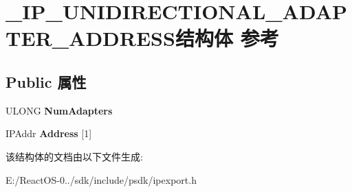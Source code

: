\hypertarget{struct___i_p___u_n_i_d_i_r_e_c_t_i_o_n_a_l___a_d_a_p_t_e_r___a_d_d_r_e_s_s}{}\section{\+\_\+\+I\+P\+\_\+\+U\+N\+I\+D\+I\+R\+E\+C\+T\+I\+O\+N\+A\+L\+\_\+\+A\+D\+A\+P\+T\+E\+R\+\_\+\+A\+D\+D\+R\+E\+S\+S结构体 参考}
\label{struct___i_p___u_n_i_d_i_r_e_c_t_i_o_n_a_l___a_d_a_p_t_e_r___a_d_d_r_e_s_s}
\subsection*{Public 属性}
\begin{DoxyCompactItemize}
\item 
\mbox{\label{struct___i_p___u_n_i_d_i_r_e_c_t_i_o_n_a_l___a_d_a_p_t_e_r___a_d_d_r_e_s_s_aa43a8cae6983fa14b9c3e67a9315f901}} 
U\+L\+O\+NG {\bfseries Num\+Adapters}
\item 
\mbox{\label{struct___i_p___u_n_i_d_i_r_e_c_t_i_o_n_a_l___a_d_a_p_t_e_r___a_d_d_r_e_s_s_a03bb8ce9c907442f144f2158c1ac5f4a}} 
I\+P\+Addr {\bfseries Address} \mbox{[}1\mbox{]}
\end{DoxyCompactItemize}


该结构体的文档由以下文件生成\+:\begin{DoxyCompactItemize}
\item 
E\+:/\+React\+O\+S-\/0../sdk/include/psdk/ipexport.\+h\end{DoxyCompactItemize}
